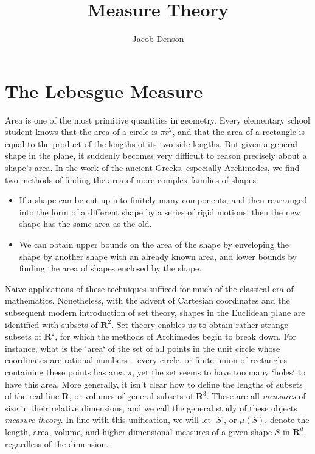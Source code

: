 

\title{Measure Theory}
\author{Jacob Denson}




\maketitle

\tableofcontents


\chapter{The Lebesgue Measure}

Area is one of the most primitive quantities in geometry. Every elementary school student knows that the area of a circle is $\pi r^2$, and that the area of a rectangle is equal to the product of the lengths of its two side lengths. But given a general shape in the plane, it suddenly becomes very difficult to reason precisely about a shape's area. In the work of the ancient Greeks, especially Archimedes, we find two methods of finding the area of more complex families of shapes:
%
\begin{itemize}
    \item If a shape can be cut up into finitely many components, and then rearranged into the form of a different shape by a series of rigid motions, then the new shape has the same area as the old.

    \item We can obtain upper bounds on the area of the shape by enveloping the shape by another shape with an already known area, and lower bounds by finding the area of shapes enclosed by the shape.
\end{itemize}
%
Naive applications of these techniques sufficed for much of the classical era of mathematics. Nonetheless, with the advent of Cartesian coordinates and the subsequent modern introduction of set theory, shapes in the Euclidean plane are identified with subsets of $\mathbf{R}^2$. Set theory enables us to obtain rather strange subsets of $\mathbf{R}^2$, for which the methods of Archimedes begin to break down. For instance, what is the `area` of the set of all points in the unit circle whose coordinates are rational numbers -- every circle, or finite union of rectangles containing these points has area $\pi$, yet the set seems to have too many `holes` to have this area. More generally, it isn't clear how to define the lengths of subsets of the real line $\mathbf{R}$, or volumes of general subsets of $\mathbf{R}^3$. These are all {\it measures} of size in their relative dimensions, and we call the general study of these objects {\it measure theory}. In line with this unification, we will let $|S|$, or $\mu(S)$, denote the length, area, volume, and higher dimensional measures of a given shape $S$ in $\mathbf{R}^d$, regardless of the dimension.

